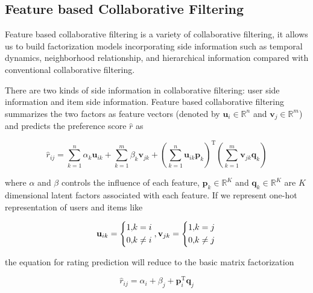 \documentclass{llncs}
\begin{document}
\subsection{Feature based Collaborative Filtering}
Feature based collaborative filtering \cite{chen2011feature} is a variety of
collaborative filtering, it allows us to build factorization models incorporating
side information such as temporal dynamics, neighborhood relationship,
and hierarchical information compared with conventional collaborative filtering.

There are two kinds of side information in collaborative filtering:
user side information and item side information.
Feature based collaborative filtering summarizes the two factors as feature vectors
(denoted by $\mathbf{u}_i \in \mathbb{R}^{n}$ and $\mathbf{v}_j \in \mathbb{R}^{m}$) and predicts
the preference score $\hat{r}$ as

\begin{equation}
\hat{r}_{ij} = \sum_{k=1}^{n} \alpha_k \mathbf{u}_{ik} + \sum_{k=1}^{m} \beta_k \mathbf{v}_{jk} +
\left( \sum_{k=1}^{n} \mathbf{u}_{ik} \mathbf{p}_k \right) ^ \mathrm{T}
\left( \sum_{k=1}^{m} \mathbf{v}_{jk} \mathbf{q}_k \right)
\end{equation}

where $\alpha$ and $\beta$ controls the influence of each feature,
$\mathbf{p}_{k} \in \mathbb{R}^K$ and $\mathbf{q}_{k} \in \mathbb{R}^K$
are $K$ dimensional latent factors associated with each feature.
If we represent one-hot representation of users and items like

\begin{equation}
\mathbf{u}_{ik} =
\left\{
\begin{aligned}
1, &k = i \\
0, &k \not= i
\end{aligned}
\right. \\ , 
\mathbf{v}_{jk} =
\left\{
\begin{aligned}
1, &k = j \\
0, &k \not= j
\end{aligned}
\right. \\
\end{equation}

the equation for rating prediction will reduce to the basic matrix factorization

\begin{equation}
\hat{r}_{ij} = \alpha_i + \beta_j + \mathbf{p}_i ^ \mathrm{T} \mathbf{q}_j
\end{equation}
\end{document}
